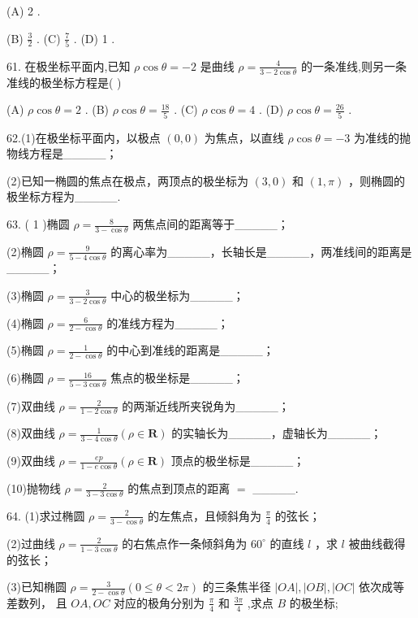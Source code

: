 \documentclass[10pt]{article}
\begin{document}
(A) 2 .

(B) \(\frac{3}{2}\) . (C) \(\frac{7}{5}\) . (D) 1 .

61. 在极坐标平面内,已知 \(\rho \cos \theta  =  - 2\) 是曲线 \(\rho  = \frac{4}{3 - 2\cos \theta }\) 的一条准线,则另一条准线的极坐标方程是( )

(A) \(\rho \cos \theta  = 2\) . (B) \(\rho \cos \theta  = \frac{18}{5}\) . (C) \(\rho \cos \theta  = 4\) . (D) \(\rho \cos \theta  = \frac{26}{5}\) .

62.(1)在极坐标平面内，以极点 \(\left( {0,0}\right)\) 为焦点，以直线 \(\rho \cos \theta  =  - 3\) 为准线的抛物线方程是\_\_\_\_\_；

(2)已知一椭圆的焦点在极点，两顶点的极坐标为 \(\left( {3,0}\right)\) 和 \(\left( {1,\pi }\right)\) ，则椭圆的极坐标方程为\_\_\_\_\_.

63. ( 1 )椭圆 \(\rho  = \frac{8}{3 - \cos \theta }\) 两焦点间的距离等于\_\_\_\_\_；

(2)椭圆 \(\rho  = \frac{9}{5 - 4\cos \theta }\) 的离心率为\_\_\_\_\_，长轴长是\_\_\_\_\_，两准线间的距离是\_\_\_\_\_；

(3)椭圆 \(\rho  = \frac{3}{3 - 2\cos \theta }\) 中心的极坐标为\_\_\_\_\_；

(4)椭圆 \(\rho  = \frac{6}{2 - \cos \theta }\) 的准线方程为\_\_\_\_\_；

(5)椭圆 \(\rho  = \frac{1}{2 - \cos \theta }\) 的中心到准线的距离是\_\_\_\_\_；

(6)椭圆 \(\rho  = \frac{16}{5 - 3\cos \theta }\) 焦点的极坐标是\_\_\_\_\_；

(7)双曲线 \(\rho  = \frac{2}{1 - 2\cos \theta }\) 的两渐近线所夹锐角为\_\_\_\_\_；

(8)双曲线 \(\rho  = \frac{1}{3 - 4\cos \theta }\left( {\rho  \in  \mathbf{R}}\right)\) 的实轴长为\_\_\_\_\_，虚轴长为\_\_\_\_\_；

(9)双曲线 \(\rho  = \frac{ep}{1 - e\cos \theta }\left( {\rho  \in  \mathbf{R}}\right)\) 顶点的极坐标是\_\_\_\_\_；

(10)抛物线 \(\rho  = \frac{2}{3 - 3\cos \theta }\) 的焦点到顶点的距离 \(=\) \_\_\_\_\_.

64. (1)求过椭圆 \(\rho  = \frac{2}{3 - \cos \theta }\) 的左焦点，且倾斜角为 \(\frac{\pi }{4}\) 的弦长；

(2)过曲线 \(\rho  = \frac{2}{1 - 3\cos \theta }\) 的右焦点作一条倾斜角为 \({60}^{ \circ  }\) 的直线 \(l\) ，求 \(l\) 被曲线截得的弦长；

(3)已知椭圆 \(\rho  = \frac{3}{2 - \cos \theta }\left( {0 \leq  \theta  < {2\pi }}\right)\) 的三条焦半径 \(\left| {OA}\right| ,\left| {OB}\right| ,\left| {OC}\right|\) 依次成等差数列， 且 \({OA},{OC}\) 对应的极角分别为 \(\frac{\pi }{4}\) 和 \(\frac{3\pi }{4}\) ,求点 \(B\) 的极坐标;
\end{document}
